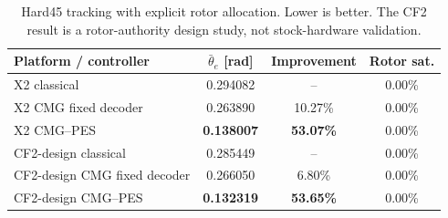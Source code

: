 \begin{table}[t]
\centering
\caption{Hard45 tracking with explicit rotor allocation. Lower is better. The
CF2 result is a rotor-authority design study, not stock-hardware validation.}
\label{tab:hard45_rotor}
\begin{tabular}{lccc}
\hline
Platform / controller & $\bar\theta_e$ [rad] & Improvement & Rotor sat. \\
\hline
X2 classical & 0.294082 & -- & 0.00\% \\
X2 CMG fixed decoder & 0.263890 & 10.27\% & 0.00\% \\
X2 CMG--PES & \textbf{0.138007} & \textbf{53.07\%} & 0.00\% \\
CF2-design classical & 0.285449 & -- & 0.00\% \\
CF2-design CMG fixed decoder & 0.266050 & 6.80\% & 0.00\% \\
CF2-design CMG--PES & \textbf{0.132319} & \textbf{53.65\%} & 0.00\% \\
\hline
\end{tabular}
\end{table}
